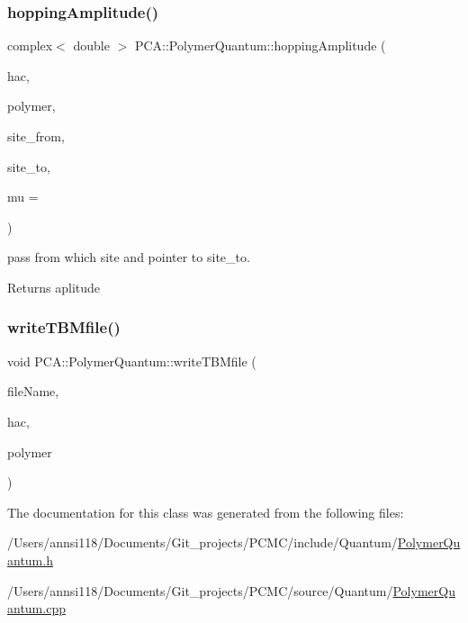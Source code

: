 \subsubsection{\texorpdfstring{hopping\+Amplitude()}{hoppingAmplitude()}}
{\footnotesize\ttfamily complex$<$ double $>$ P\+C\+A\+::\+Polymer\+Quantum\+::hopping\+Amplitude (\begin{DoxyParamCaption}\item[{const \hyperlink{class_p_c_a_1_1_hopping_amplitude_calculator}{Hopping\+Amplitude\+Calculator} \&}]{hac,  }\item[{const \hyperlink{class_p_c_a_1_1_polymer}{Polymer} \&}]{polymer,  }\item[{int}]{site\+\_\+from,  }\item[{int}]{site\+\_\+to,  }\item[{double}]{mu = {} }\end{DoxyParamCaption})\hspace{0.3cm}{\ttfamily [static]}}



pass from which site and pointer to site\+\_\+to. 

Returns aplitude \hypertarget{class_p_c_a_1_1_polymer_quantum_ac035f7bd1e3f5779d82048af7794e05d}{}\label{class_p_c_a_1_1_polymer_quantum_ac035f7bd1e3f5779d82048af7794e05d} 
\subsubsection{\texorpdfstring{write\+T\+B\+Mfile()}{writeTBMfile()}}
{\footnotesize\ttfamily void P\+C\+A\+::\+Polymer\+Quantum\+::write\+T\+B\+Mfile (\begin{DoxyParamCaption}\item[{char $\ast$}]{file\+Name,  }\item[{const \hyperlink{class_p_c_a_1_1_hopping_amplitude_calculator}{Hopping\+Amplitude\+Calculator} \&}]{hac,  }\item[{const \hyperlink{class_p_c_a_1_1_polymer}{Polymer} \&}]{polymer }\end{DoxyParamCaption})\hspace{0.3cm}{\ttfamily [static]}}



The documentation for this class was generated from the following files\+:\begin{DoxyCompactItemize}
\item 
/\+Users/annsi118/\+Documents/\+Git\+\_\+projects/\+P\+C\+M\+C/include/\+Quantum/\hyperlink{_polymer_quantum_8h}{Polymer\+Quantum.\+h}\item 
/\+Users/annsi118/\+Documents/\+Git\+\_\+projects/\+P\+C\+M\+C/source/\+Quantum/\hyperlink{_polymer_quantum_8cpp}{Polymer\+Quantum.\+cpp}\end{DoxyCompactItemize}
